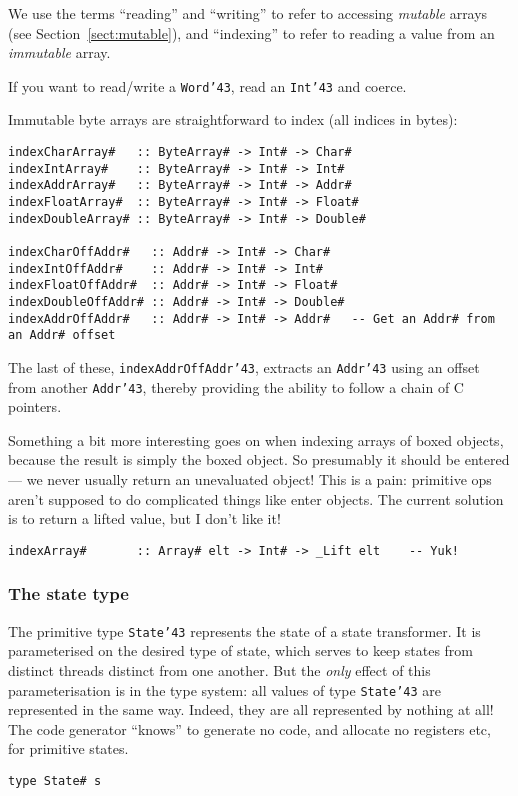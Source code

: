We use the terms ``reading'' and ``writing'' to refer to accessing {\em mutable} 
arrays (see Section~\ref{sect:mutable}), and ``indexing'' 
to refer to reading a value from an {\em immutable} 
array.

If you want to read/write a \mbox{\tt Word{\char'43}}, read an \mbox{\tt Int{\char'43}} and coerce.

Immutable byte arrays are straightforward to index (all indices in bytes):
\begin{verbatim}
indexCharArray#   :: ByteArray# -> Int# -> Char#
indexIntArray#    :: ByteArray# -> Int# -> Int#
indexAddrArray#   :: ByteArray# -> Int# -> Addr#
indexFloatArray#  :: ByteArray# -> Int# -> Float#
indexDoubleArray# :: ByteArray# -> Int# -> Double#

indexCharOffAddr#   :: Addr# -> Int# -> Char#
indexIntOffAddr#    :: Addr# -> Int# -> Int#
indexFloatOffAddr#  :: Addr# -> Int# -> Float#
indexDoubleOffAddr# :: Addr# -> Int# -> Double#
indexAddrOffAddr#   :: Addr# -> Int# -> Addr#   -- Get an Addr# from an Addr# offset
\end{verbatim}
The last of these, \mbox{\tt indexAddrOffAddr{\char'43}}, extracts an \mbox{\tt Addr{\char'43}} using an offset
from another \mbox{\tt Addr{\char'43}}, thereby providing the ability to follow a chain of
C pointers.

Something a bit more interesting goes on when indexing arrays of boxed
objects, because the result is simply the boxed object. So presumably
it should be entered --- we never usually return an unevaluated
object!  This is a pain: primitive ops aren't supposed to do
complicated things like enter objects.  The current solution is to
return a lifted value, but I don't like it!
\begin{verbatim}
indexArray#       :: Array# elt -> Int# -> _Lift elt    -- Yuk!
\end{verbatim}

\subsubsection{The state type}

The primitive type \mbox{\tt State{\char'43}} represents the state of a state transformer.
It is parameterised on the desired type of state, which serves to keep
states from distinct threads distinct from one another.  But the {\em only}
effect of this parameterisation is in the type system: all values of type
\mbox{\tt State{\char'43}} are represented in the same way.  Indeed, they are all 
represented by nothing at all!  The code generator ``knows'' to generate no 
code, and allocate no registers etc, for primitive states.
\begin{verbatim}
type State# s
\end{verbatim}

